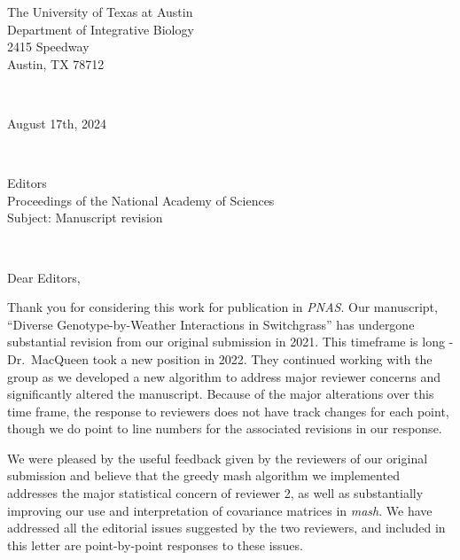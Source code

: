 \documentclass[
  letterpaper,
  DIV=11,
  numbers=noendperiod]{scrartcl}
\author{}
\date{}
\begin{document}
\begin{flushright}
The University of Texas at Austin\\
Department of Integrative Biology\\
2415 Speedway\\
Austin, TX 78712

\end{flushright}

~

\begin{flushright}
August 17th, 2024

\end{flushright}

~

\begin{flushleft}
Editors\\
Proceedings of the National Academy of Sciences\\

Subject: Manuscript revision

\end{flushleft}

~

Dear Editors,

Thank you for considering this work for publication in \emph{PNAS}. Our
manuscript, ``Diverse Genotype-by-Weather Interactions in Switchgrass''
has undergone substantial revision from our original submission in 2021.
This timeframe is long - Dr.~MacQueen took a new position in 2022. They
continued working with the group as we developed a new algorithm to
address major reviewer concerns and significantly altered the
manuscript. Because of the major alterations over this time frame, the
response to reviewers does not have track changes for each point, though
we do point to line numbers for the associated revisions in our
response.

We were pleased by the useful feedback given by the reviewers of our
original submission and believe that the greedy mash algorithm we
implemented addresses the major statistical concern of reviewer 2, as
well as substantially improving our use and interpretation of covariance
matrices in \emph{mash}. We have addressed all the editorial issues
suggested by the two reviewers, and included in this letter are
point-by-point responses to these issues.
\end{document}
